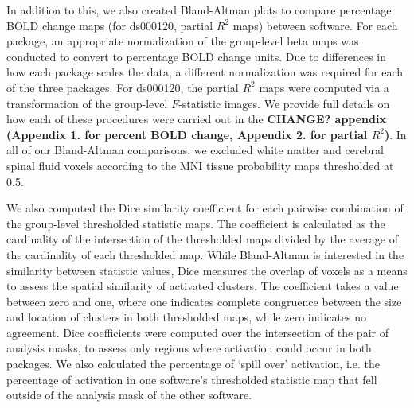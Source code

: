 In addition to this, we also created Bland-Altman plots to compare percentage BOLD change maps (for ds000120, partial $R^{2}$ maps) between software. For each package, an appropriate normalization of the group-level beta maps was conducted to convert to percentage BOLD change units. Due to differences in how each package scales the data, a different normalization was required for each of the three packages. For ds000120, the partial $R^{2}$ maps were computed via a transformation of the group-level $F$-statistic images. We provide full details on how each of these procedures were carried out in the \textbf{CHANGE? appendix (Appendix 1. for percent BOLD change, Appendix 2. for partial $R^{2}$)}. In all of our Bland-Altman comparisons, we excluded white matter and cerebral spinal fluid voxels according to the MNI tissue probability maps thresholded at 0.5. 

We also computed the Dice similarity coefficient for each pairwise combination of the group-level thresholded statistic maps. The coefficient is calculated as the cardinality of the intersection of the thresholded maps divided by the average of the cardinality of each thresholded map. While Bland-Altman is interested in the similarity between statistic values, Dice measures the overlap of voxels as a means to assess the spatial similarity of activated clusters. The coefficient takes a value between zero and one, where one indicates complete congruence between the size and location of clusters in both thresholded maps, while zero indicates no agreement. Dice coefficients were computed over the intersection of the pair of analysis masks, to assess only regions where activation could occur in both packages. We also calculated the percentage of `spill over' activation, i.e. the percentage of activation in one software's thresholded statistic map that fell outside of the analysis mask of the other software. 

